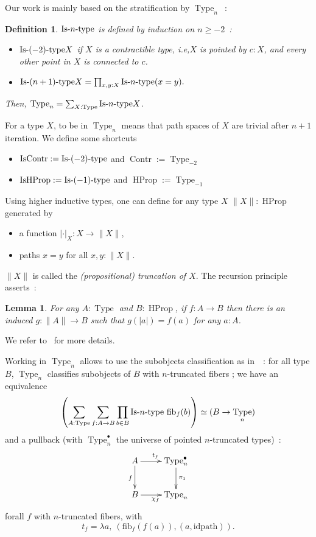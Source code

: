 \documentclass[conference]{IEEEtran}
\newtheorem{defi}[thm]{Definition}
\newtheorem{lem}[thm]{Lemma}
\newcommand{\ie}{i.e,\xspace}
\DeclareMathOperator{\Type}{Type}
\DeclareMathOperator{\HProp}{HProp}
\DeclareMathOperator{\IsHProp}{IsHProp}
\DeclareMathOperator{\Contr}{Contr}
\DeclareMathOperator{\IsContr}{IsContr}
\def\mymathhyphen{{\hbox{-}}}
\newcommand{\IsType}[1]{\mathrm{Is\mymathhyphen}#1\mathrm{\mymathhyphen
    type}}
\begin{document}
Our work is mainly based on the stratification by $\Type_n$~:
\begin{defi}
  $\IsType n$ is defined by induction on $n\geqslant -2$~:
  \begin{itemize}
  \item $\IsType {(-2)} X$ if $X$ is a contractible type, \ie $X$
    is pointed by $c:X$, and every other point in $X$ is connected to $c$.
  \item $\IsType {(n+1)} X = \prod_{x,y:X} \IsType n (x=y).$
  \end{itemize}
  Then, $\Type_n = \sum_{X:\Type} \IsType n X$.
\end{defi}
For a type $X$, to be in $\Type_n$ means that path spaces of $X$ are
trivial after $n+1$ iteration.
We define some shortcuts
\begin{itemize}
\item $\IsContr := \IsType {(-2)}$ and $\Contr := \Type_{-2}$
\item $\IsHProp := \IsType {(-1)}$ and $\HProp := \Type_{-1}$
\end{itemize}

Using higher inductive types, one can define for any type $X$ $\|X\| : \HProp$
generated by 
\begin{itemize}
\item a function $|\cdot|_X : X \to \|X\|$,
\item paths $x=y$ for all $x,y:\|X\|$.
\end{itemize}
$\|X\|$ is called the {\em (propositional) truncation of $X$}. The recursion principle asserts~:
\begin{lem}
  For any $A:\Type$ and $B:\HProp$, if $f:A \to B$ then there is an
  induced $g:\|A\|\to B$ such that $g(|a|)= f(a)$ for any $a:A$.
\end{lem}
We refer to~\cite{hottbook} for more details.

Working in $\Type_n$ allows to use the subobjects classification as in~\cite{sets_in_hott}~: for
all type $B$, $\Type_n$ classifies subobjects of $B$ with $n$-truncated
fibers ; we have an equivalence
$$\left(\sum_{A:\Type} \sum_{f:A \to B} \prod_{b\in B}
\IsType n~\mathrm{fib}_f(b)\right) \simeq (B \to \Type_n)$$
and a pullback (with $\Type_n^\bullet$ the universe of pointed
$n$-truncated types)~:
$$
\xymatrix{
  A \ar[r]^{t_f} \ar[d]_f & \Type_n^\bullet \ar[d]^{\pi_1}\\
  B \ar[r]_{\chi_f} & \Type_n
}
$$
forall $f$ with $n$-truncated fibers, with 
$$t_f = \lambda a,~(\mathrm{fib}_f(f(a)),(a,\mathrm{idpath})).$$
\end{document}
